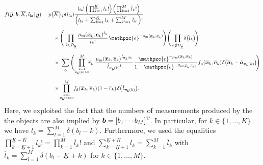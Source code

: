 \documentclass[11pt,a4paper]{article}
\newcommand{\ist}{\hspace*{.3mm}}
\newcommand{\rmv}{\hspace*{-.3mm}}
\newcommand{\cl}[1]{\mathcal{#1}}
\newcommand{\nn}{\nonumber}
\newcommand{\T}{\text{T}}
\newcommand{\avnew}{\overline{\V{a}}}
\newcommand{\xnew}{\overline{\V{x}}}
\newcommand{\enew}{\overline{\V{e}}}
\newcommand{\rnew}{\overline{r}}
\newcommand{\avt}{\tilde{\V{a}}}
\newcommand{\fd}{f_{\mathrm{d}}}
\begin{document}
\begin{align}
f(\overline{\V{y}}, \V{b}, \overline{K}, l_{\mathrm{fa}} \ist | \ist \underline{\V{y}})    &\hspace{0mm}=  p\big( \overline{K} \big)    \ist\ist p(l_{\mathrm{fa}} )\frac{l_{\mathrm{fa}}! \ist \Big(\prod^{\underline{K}}_{k=1} l_{k} ! \Big) \ist \Big(\prod^{M}_{k=1} \overline{l}_{k} ! \Big)}{\Big( l_{\mathrm{fa}}  + \sum^{\underline{K}}_{k=1}  l_{k}  +  \sum^{M}_{k'=1} \ist \overline{l}_{k'}  \Big)!} \nn\\[2mm]
&\hspace{8mm}\times \rmv \Bigg ( \ist \prod_{k \in \cl{D}_{\underline{\V{y}}}} \frac{\mu_{\mathrm{m}} (\underline{\V{x}}_k,\underline{\V{e}}_k)^{l_k}}{l_{k}!} \ist \mathpzc{e}^{-\mu_{\mathrm{m}}(\underline{\V{x}}_k,\underline{\V{e}}_k)}  \rmv  \Bigg) \Bigg( \prod_{k \notin \cl{D}_{\underline{\V{y}}}}  \rmv \delta \big(l_{k}\big) \rmv \rmv   \Bigg) \nn\\[2mm]
&\hspace{8mm}\times  \ist\ist\ist \sum_{\tilde{\V{b}}}\Bigg( \rmv\rmv\rmv  \prod_{k=1 \atop \V{\pi}_{\tilde{\V{b}}}(k)>0}^M \rmv\rmv\rmv\rmv\rmv \rnew_k \ist\ist\ist \frac{\mu_{\mathrm{m}}(\overline{\V{x}}_k,\overline{\V{e}}_k)^{\ist \tilde{l}_{\V{\pi}_{\tilde{\V{b}}}(k) }}}{\tilde{l}_{ \V{\pi}_{\tilde{\V{b}}}(k) }!} \frac{\mathpzc{e}^{-\mu_{\mathrm{m}}(\overline{\V{x}}_k,\overline{\V{e}}_k)}}{1-\mathpzc{e}^{-\mu_{\mathrm{m}(\overline{\V{x}}_k,\overline{\V{e}}_k)}}} \ist f_{\mathrm{n}}(\overline{\V{x}}_k, \overline{\V{e}}_k) \ist \delta\big(\avnew_k-\avt_{\V{\pi}_{\tilde{\V{b}}}(k)}\big) \rmv\rmv\Bigg) \nn\\[2mm]
&\hspace{8mm}\times  \rmv\rmv\rmv \prod_{k=1 \atop \V{\pi}_{\tilde{\V{b}}}(k)=0}^M \rmv\rmv\rmv\rmv \fd(\xnew_k,\enew_k) \ist (1-\rnew_k) \hspace{.5mm} \delta\big(\ist \tilde{l}_{\V{\pi}_{\tilde{\V{b}}}(k)} \big) . \nn
\end{align}
%
Here, we exploited the fact that the numbers of measurements produced by the the objects are also implied by $\V{b} = [b_1 \cdots b_M]^{\T}\rmv$. In particular, for $k \in \big\{1,\dots,\underline{K}\big\}$ we have $l_k = \sum^M_{l=1} \delta(b_l - k)$. Furthermore, we used the equalities $\prod^{\underline{K} + \overline{K}}_{k=\underline{K}+1} l_{k} ! = \prod^{M}_{k=1} \overline{l}_k !$ and $\sum^{\underline{K} + \overline{K}}_{k=\underline{K}+1} l_{k} = \sum^{M}_{k=1} \overline{l}_k$ with $\overline{l}_k = \sum^M_{l=1} \delta(b_l - \underline{K} + k)$ for $k \in \big\{1,\dots,M\big\}$. 
\end{document}
